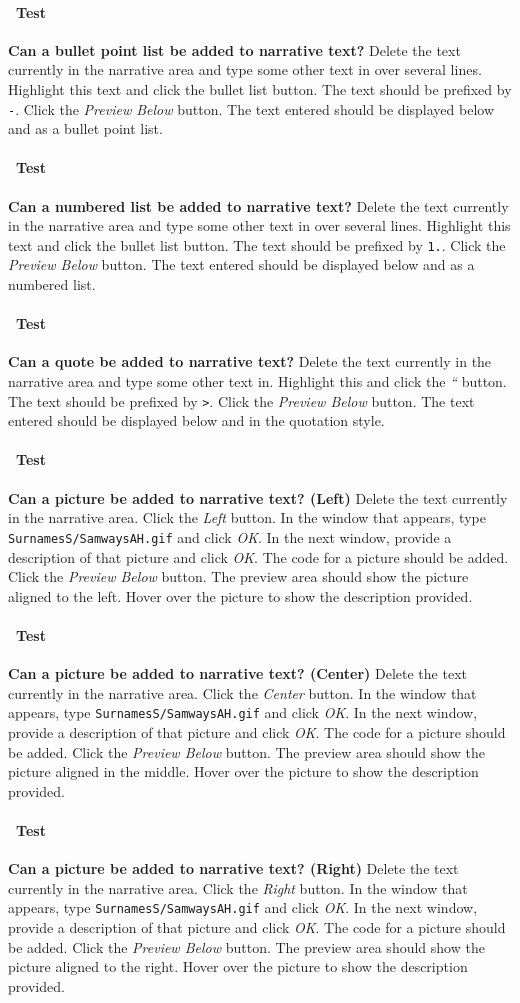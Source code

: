 \documentclass[12pt]{article}
\newcounter{Test}
\newcommand{\test}[1]{%
\stepcounter{Test}%
\paragraph{\Circle\ Test \theTest} \textbf{#1} }
\begin{document}
\test{Can a bullet point list be added to narrative text?}
Delete the text currently in the narrative area and type some other text in over several lines. Highlight this text and click the bullet list button. The text should be prefixed by \texttt{-}. Click the \textit{Preview Below} button. The text entered should be displayed below and as a bullet point list.

\test{Can a numbered list be added to narrative text?}
Delete the text currently in the narrative area and type some other text in over several lines. Highlight this text and click the bullet list button. The text should be prefixed by \texttt{1.}. Click the \textit{Preview Below} button. The text entered should be displayed below and as a numbered list.

\test{Can a quote be added to narrative text?}
Delete the text currently in the narrative area and type some other text in. Highlight this and click the \textit{``} button. The text should be prefixed by \texttt{\textgreater}. Click the \textit{Preview Below} button. The text entered should be displayed below and in the quotation style.

\test{Can a picture be added to narrative text? (Left)}
Delete the text currently in the narrative area. Click the \textit{Left} button. In the window that appears, type \texttt{SurnamesS/SamwaysAH.gif} and click \textit{OK}. In the next window, provide a description of that picture and click \textit{OK}. The code for a picture should be added. Click the \textit{Preview Below} button. The preview area should show the picture aligned to the left. Hover over the picture to show the description provided.

\test{Can a picture be added to narrative text? (Center)}
Delete the text currently in the narrative area. Click the \textit{Center} button. In the window that appears, type \texttt{SurnamesS/SamwaysAH.gif} and click \textit{OK}. In the next window, provide a description of that picture and click \textit{OK}. The code for a picture should be added. Click the \textit{Preview Below} button. The preview area should show the picture aligned in the middle. Hover over the picture to show the description provided.

\test{Can a picture be added to narrative text? (Right)}
Delete the text currently in the narrative area. Click the \textit{Right} button. In the window that appears, type \texttt{SurnamesS/SamwaysAH.gif} and click \textit{OK}. In the next window, provide a description of that picture and click \textit{OK}. The code for a picture should be added. Click the \textit{Preview Below} button. The preview area should show the picture aligned to the right. Hover over the picture to show the description provided.
\end{document}
